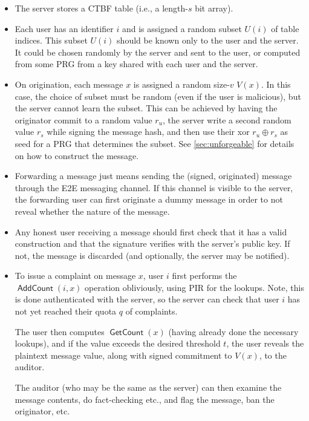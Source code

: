 \documentclass[letterpaper,12pt]{article}
\DeclareMathOperator{\AddCount}{\textsf{AddCount}}
\DeclareMathOperator{\GetCount}{\textsf{GetCount}}
\begin{document}
\begin{itemize}
  \item The server stores a CTBF table (i.e., a length-$s$ bit array).

  \item Each user has an identifier $i$ and is assigned a random subset $U(i)$
    of table indices. This subset $U(i)$ should be known only to the
    user and the server. It could be chosen randomly by the server and
    sent to the user, or computed from some PRG from a key shared with
    each user and the server.

  \item On origination, each message $x$ is assigned a random size-$v$
    $V(x)$. In this case, the choice of subset must be random (even if
    the user is malicious), but the server cannot learn the subset. This
    can be achieved by having the originator commit to a random value
    $r_u$, the server write a second random value $r_s$ while signing
    the message hash, and then use their xor $r_u\oplus r_s$ as seed for
    a PRG that determines the subset. See \cref{sec:unforgeable} for
    details on how to construct the message.

  \item Forwarding a message just means sending the (signed, originated)
    message through the E2E messaging channel. If this channel is
    visible to the server, the forwarding user can first originate a
    dummy message in order to not reveal whether the nature of the
    message.

  \item Any honest user receiving a message should first check that it
    has a valid construction and that the signature verifies with the
    server's public key. If not, the message is discarded (and optionally,
    the server may be notified).

  \item To issue a complaint on message $x$, user $i$ first performs
    the $\AddCount(i,x)$ operation obliviously, using PIR for the
    lookups. Note, this is done authenticated with the server, so the
    server can check that user $i$ has not yet reached their quota $q$
    of complaints.

    The user then computes $\GetCount(x)$ (having already done
    the necessary lookups), and if the value exceeds the desired
    threshold $t$, the user reveals the plaintext message value, along
    with signed commitment to $V(x)$, to the auditor.

    The auditor (who may be the same as the server)
    can then examine the message contents, do fact-checking etc., and
    flag the message, ban the originator, etc.
\end{itemize}
\end{document}
